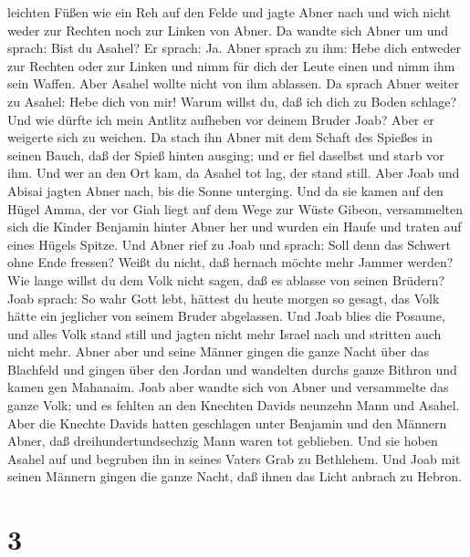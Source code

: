 leichten Füßen wie ein Reh auf den Felde  und jagte Abner
nach und wich nicht weder zur Rechten noch zur Linken von Abner.
 Da wandte sich Abner um und sprach: Bist du Asahel? Er
sprach: Ja.  Abner sprach zu ihm: Hebe dich entweder zur
Rechten oder zur Linken und nimm für dich der Leute einen und nimm ihm
sein Waffen. Aber Asahel wollte nicht von ihm ablassen.  Da
sprach Abner weiter zu Asahel: Hebe dich von mir! Warum willst du, daß
ich dich zu Boden schlage? Und wie dürfte ich mein Antlitz aufheben vor
deinem Bruder Joab?  Aber er weigerte sich zu weichen. Da
stach ihn Abner mit dem Schaft des Spießes in seinen Bauch, daß der
Spieß hinten ausging; und er fiel daselbst und starb vor ihm. Und wer an
den Ort kam, da Asahel tot lag, der stand still.  Aber Joab
und Abisai jagten Abner nach, bis die Sonne unterging. Und da sie kamen
auf den Hügel Amma, der vor Giah liegt auf dem Wege zur Wüste Gibeon,
 versammelten sich die Kinder Benjamin hinter Abner her und
wurden ein Haufe und traten auf eines Hügels Spitze.  Und
Abner rief zu Joab und sprach: Soll denn das Schwert ohne Ende fressen?
Weißt du nicht, daß hernach möchte mehr Jammer werden? Wie lange willst
du dem Volk nicht sagen, daß es ablasse von seinen Brüdern?
 Joab sprach: So wahr Gott lebt, hättest du heute morgen so
gesagt, das Volk hätte ein jeglicher von seinem Bruder abgelassen.
 Und Joab blies die Posaune, und alles Volk stand still und
jagten nicht mehr Israel nach und stritten auch nicht mehr.
 Abner aber und seine Männer gingen die ganze Nacht über
das Blachfeld und gingen über den Jordan und wandelten durchs ganze
Bithron und kamen gen Mahanaim.  Joab aber wandte sich von
Abner und versammelte das ganze Volk; und es fehlten an den Knechten
Davids neunzehn Mann und Asahel.  Aber die Knechte Davids
hatten geschlagen unter Benjamin und den Männern Abner, daß
dreihundertundsechzig Mann waren tot geblieben.  Und sie
hoben Asahel auf und begruben ihn in seines Vaters Grab zu Bethlehem.
Und Joab mit seinen Männern gingen die ganze Nacht, daß ihnen das Licht
anbrach zu Hebron.

\hypertarget{section-2}{%
\section{3}\label{section-2}}

